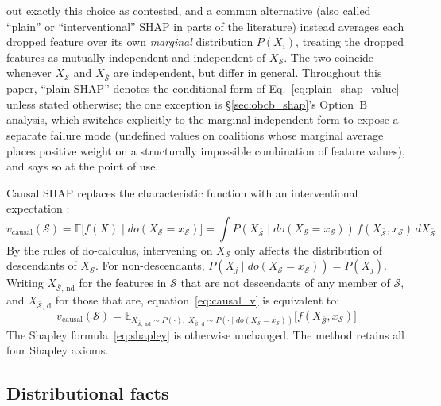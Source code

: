 \begin{definition}[SHAP]
out exactly this choice as contested, and a common alternative (also called ``plain'' or ``interventional'' SHAP in parts of the literature) instead averages
each dropped feature over its own \emph{marginal} distribution $P(X_i)$, treating the
dropped features as mutually independent and independent of $X_{\mathcal{S}}$. The two
coincide whenever $X_{\mathcal{S}}$ and $X_{\bar{\mathcal{S}}}$ are independent, but
differ in general. Throughout this paper, ``plain SHAP'' denotes the conditional form
of Eq.~\eqref{eq:plain_shap_value} unless stated otherwise; the one exception is
\S\ref{sec:obcb_shap}'s Option~B analysis, which switches explicitly to the
marginal-independent form to expose a separate failure mode (undefined values on
coalitions whose marginal average places positive weight on a structurally impossible
combination of feature values), and says so at the point of use.
\end{definition}

\begin{definition}\label{def:causalshap}
Causal SHAP replaces the characteristic function with an interventional
expectation \citep{heskes2020causal}:
\begin{equation}
v_{\text{causal}}(\mathcal{S}) = \mathbb{E}\bigl[f(X) \mid do(X_{\mathcal{S}} = x_{\mathcal{S}})\bigr]
= \int P(X_{\bar{\mathcal{S}}} \mid do(X_{\mathcal{S}} = x_{\mathcal{S}}))\, f(X_{\bar{\mathcal{S}}}, x_{\mathcal{S}})\, dX_{\bar{\mathcal{S}}}
\label{eq:causal_v}
\end{equation}
By the rules of do-calculus, intervening on $X_{\mathcal{S}}$ only affects the distribution of
descendants of $X_{\mathcal{S}}$. For non-descendants, $P(X_j \mid do(X_{\mathcal{S}} = x_{\mathcal{S}})) = P(X_j)$.
Writing $X_{\bar{\mathcal{S}},\,\mathrm{nd}}$ for the features in $\bar{\mathcal{S}}$ that are not
descendants of any member of $\mathcal{S}$, and $X_{\bar{\mathcal{S}},\,\mathrm{d}}$ for those that are,
equation~\eqref{eq:causal_v} is equivalent to:
\begin{equation}
v_{\text{causal}}(\mathcal{S}) = \mathbb{E}_{X_{\bar{\mathcal{S}},\,\mathrm{nd}} \sim P(\cdot),\;
X_{\bar{\mathcal{S}},\,\mathrm{d}} \sim P(\cdot \mid do(X_{\mathcal{S}}=x_{\mathcal{S}}))}\bigl[f(X_{\bar{\mathcal{S}}}, x_{\mathcal{S}})\bigr]
\end{equation}
The Shapley formula~\eqref{eq:shapley} is otherwise unchanged. The method retains all
four Shapley axioms.
\end{definition}

\subsection{Distributional facts}\label{app:signal_distfacts}

